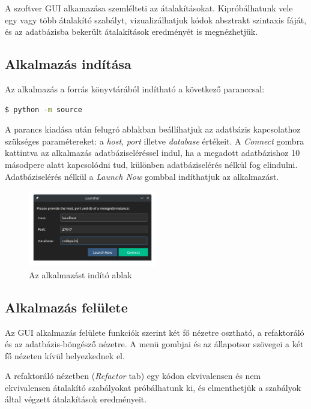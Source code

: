 A szoftver GUI alkamazása szemlélteti az átalakításokat.
Kipróbálhatunk vele egy vagy több átalakító szabályt,
vizualizálhatjuk kódok absztrakt szintaxis fáját,
és az adatbázisba bekerült átalakítások eredményét is megnézhetjük.

\subsection{Alkalmazás indítása}

Az alkalmazás a forrás könyvtárából indítható a következő paranccsal:

\begin{lstlisting}[language=bash, numbers=none]
	$ python -m source
\end{lstlisting}

A parancs kiadása után felugró ablakban beállíhatjuk az adatbázis kapcsolathoz szükséges paramétereket:
a \emph{host}, \emph{port} illetve \emph{database} értékeit.
A \emph{Connect} gombra kattintva az alkalmazás adatbáziseléréssel indul,
ha a megadott adatbázishoz 10 másodperc alatt kapcsolódni tud, különben adatbáziselérés nélkül
fog elindulni.
Adatbáziselérés nélkül a \emph{Launch Now} gombbal indíthatjuk az alkalmazást.

\begin{figure}[H]
	\centering
	\includegraphics[width=0.5\textwidth]{images/screenshots/launcher.png}
	\caption{Az alkalmazást indító ablak}
\end{figure}

\subsection{Alkalmazás felülete}

Az GUI alkalmazás felülete funkciók szerint két fő nézetre osztható,
a refaktoráló és az adatbázis-böngésző nézetre.
A menü gombjai és az állapotsor szövegei a két fő nézeten kívül helyezkednek el.

A refaktoráló nézetben (\emph{Refactor} tab) egy kódon
ekvivalensen és nem ekvivalensen átalakító szabályokat próbálhatunk ki, és elmenthetjük
a szabályok által végzett átalakítások eredményeit.

